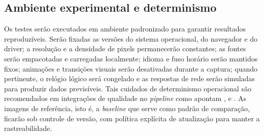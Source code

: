 \documentclass{UNESC}
\begin{document}
\subsection{Ambiente experimental e determinismo}
Os testes serão executados em ambiente padronizado para garantir resultados reproduzíveis. Serão fixadas as versões do sistema operacional, do navegador e do driver; a resolução e a densidade de pixels permanecerão constantes; as fontes serão empacotadas e carregadas localmente; idioma e fuso horário serão mantidos fixos; animações e transições visuais serão desativadas durante a captura; quando pertinente, o relógio lógico será congelado e as respostas de rede serão simuladas para produzir dados previsíveis. Tais cuidados de determinismo operacional são recomendados em integrações de qualidade no \emph{pipeline} como apontam ,  e . As imagens de referência, isto é, a \emph{baseline} que serve como padrão de comparação, ficarão sob controle de versão, com política explícita de atualização para manter a rastreabilidade.
\end{document}
